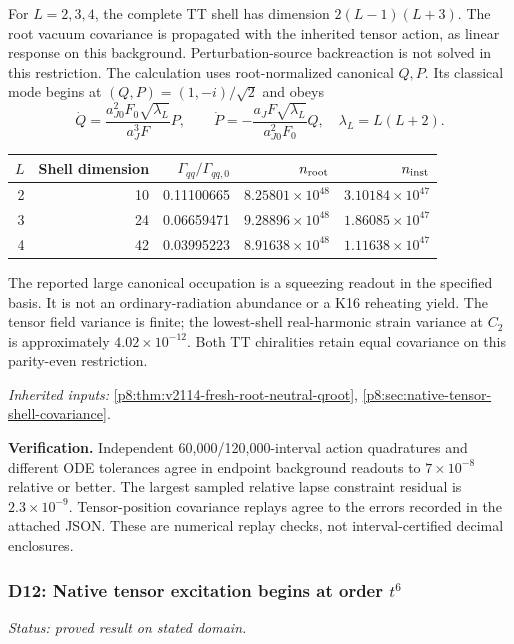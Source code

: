 \documentclass[12pt,a4paper]{article}
\begin{document}
For $L=2,3,4$, the complete TT shell has dimension $2(L-1)(L+3)$.
The root vacuum covariance is propagated with the inherited tensor action,
as linear response on this background. Perturbation-source backreaction is
not solved in this restriction. The calculation uses
root-normalized canonical $Q,P$. Its classical mode begins at
$(Q,P)=(1,-i)/\sqrt2$ and obeys
\[
 \dot Q=\frac{a_{J0}^2F_0\sqrt{\lambda_L}}{a_J^3F}P,\qquad
 \dot P=-\frac{a_JF\sqrt{\lambda_L}}{a_{J0}^2F_0}Q,
 \quad\lambda_L=L(L+2).
\]
\begin{center}\small\begin{tabular}{@{}rrrrr@{}}\toprule $L$ & Shell dimension & $\Gamma_{qq}/\Gamma_{qq,0}$ & $n_{\rm root}$ & $n_{\rm inst}$\\\midrule
2 & 10 & 0.11100665 & $8.25801\times10^{48}$ & $3.10184\times10^{47}$\\
3 & 24 & 0.06659471 & $9.28896\times10^{48}$ & $1.86085\times10^{47}$\\
4 & 42 & 0.03995223 & $8.91638\times10^{48}$ & $1.11638\times10^{47}$\\
\bottomrule\end{tabular}\end{center}
The reported large canonical occupation is a squeezing readout in the
specified basis. It is not an ordinary-radiation abundance or a K16 reheating
yield. The tensor field variance is finite; the lowest-shell real-harmonic
strain variance at $C_2$ is approximately $4.02\times10^{-12}$.
Both TT chiralities retain equal covariance on this parity-even restriction.
\par\noindent\textit{Inherited inputs:} \ref{p8:thm:v2114-fresh-root-neutral-qroot}, \ref{p8:sec:native-tensor-shell-covariance}.


\smallskip
\textbf{Verification.} Independent 60,000/120,000-interval action quadratures
and different ODE tolerances agree in endpoint background readouts to
$7\times10^{-8}$ relative or better. The largest sampled relative lapse
constraint residual is $2.3\times10^{-9}$. Tensor-position covariance
replays agree to the errors recorded in the attached JSON. These are numerical
replay checks, not interval-certified decimal enclosures.

\subsubsection{D12: Native tensor excitation begins at order $t^6$}
\label{p8:sec:v2201-derived-d12}
\noindent\textit{Status: proved result on stated domain.}
\end{document}
